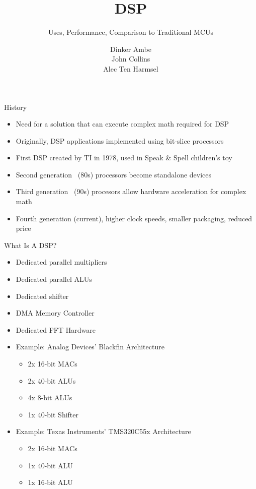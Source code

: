 \documentclass{beamer}
\begin{document}
\beamertemplatenavigationsymbolsempty

\title{DSP}
\subtitle{Uses, Performance, Comparison to Traditional MCUs}
\author{Dinker Ambe\\
John Collins\\
Alec Ten Harmsel}

\frame{\titlepage}

\begin{frame}{History}
    \begin{itemize}
        \item Need for a solution that can execute complex math required for DSP
        \item Originally, DSP applications implemented using bit-slice processors
        \item First DSP created by TI in 1978, used in Speak \& Spell children's toy
        \item Second generation ~(80s) processors become standalone devices
        \item Third generation ~(90s) procesors allow hardware acceleration for complex math
        \item Fourth generation (current), higher clock speeds, smaller packaging, reduced price
    \end{itemize}
\end{frame}

\begin{frame}{What Is A DSP?}
    \begin{itemize}
        \item Dedicated parallel multipliers
        \item Dedicated parallel ALUs
        \item Dedicated shifter
        \item DMA Memory Controller
        \item Dedicated FFT Hardware
        \item Example: Analog Devices' Blackfin Architecture
            \begin{itemize}
                \item 2x 16-bit MACs
                \item 2x 40-bit ALUs
                \item 4x 8-bit ALUs
                \item 1x 40-bit Shifter
            \end{itemize}
        \item Example: Texas Instruments' TMS320C55x Architecture
            \begin{itemize}
                \item 2x 16-bit MACs
                \item 1x 40-bit ALU
                \item 1x 16-bit ALU
            \end{itemize}
    \end{itemize}
\end{frame}
\end{document}
